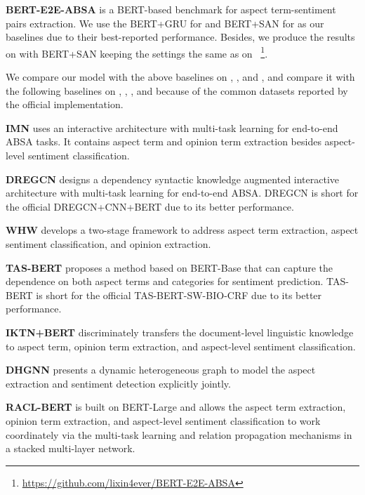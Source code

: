 \documentclass[11pt,a4paper]{article}
\begin{document}
\noindent
\textbf{BERT-E2E-ABSA} \cite{Li2019b} is a BERT-based benchmark for aspect term-sentiment pairs extraction. We use the BERT+GRU for  and BERT+SAN for  as our baselines due to their best-reported performance. Besides, we produce the results on  with BERT+SAN keeping the settings the same as on ~\footnote{\url{https://github.com/lixin4ever/BERT-E2E-ABSA}}.

We compare our model with the above baselines on , , and , and compare it with the following baselines on , , , and  because of the common datasets reported by the official implementation.

\noindent
\textbf{IMN} \cite{He2019} uses an interactive architecture with multi-task learning for end-to-end ABSA tasks. It contains aspect term and opinion term extraction besides aspect-level sentiment classification.

\noindent
\textbf{DREGCN} \cite{Liang2020a} designs a dependency syntactic knowledge augmented interactive architecture with multi-task learning for end-to-end ABSA. DREGCN is short for the official DREGCN+CNN+BERT due to its better performance.

\noindent
\textbf{WHW} \cite{Peng2020} develops a two-stage framework to address aspect term extraction, aspect sentiment classification,
and opinion extraction.

\noindent
\textbf{TAS-BERT} \cite{Wan2020} proposes a method based on BERT-Base that can capture the dependence on both aspect terms and categories for sentiment prediction. TAS-BERT is short for the official TAS-BERT-SW-BIO-CRF due to its better performance.

\noindent
\textbf{IKTN+BERT} \cite{Liang2020} discriminately transfers the document-level linguistic knowledge to aspect term, opinion term extraction, and aspect-level sentiment classification.

\noindent
\textbf{DHGNN} \cite{Liu2020} presents a dynamic heterogeneous graph to model the aspect extraction and sentiment detection explicitly jointly.

\noindent
\textbf{RACL-BERT} \cite{chen2020racl} is built on BERT-Large and allows the aspect term extraction, opinion term extraction, and aspect-level sentiment classification to work coordinately via the multi-task learning and relation propagation mechanisms in a stacked multi-layer network.
\end{document}
